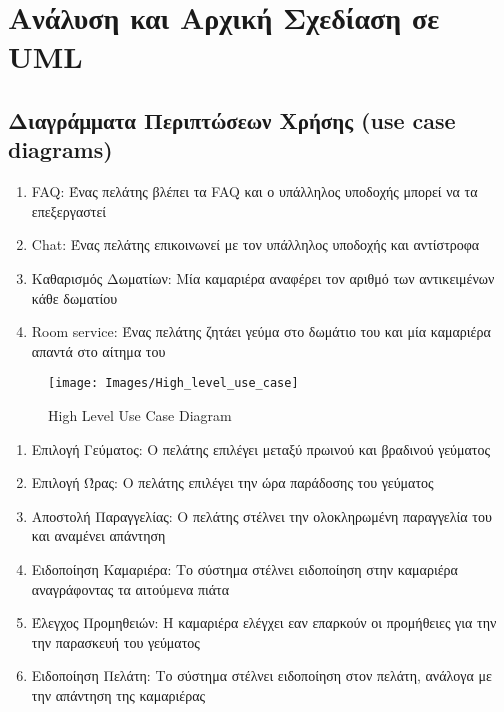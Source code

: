 \chapter{Ανάλυση και Αρχική Σχεδίαση σε UML}
	
\section{Διαγράμματα Περιπτώσεων Χρήσης (use case diagrams)}

\begin{enumerate}
	\item FAQ: Ένας πελάτης βλέπει τα FAQ και ο υπάλληλος υποδοχής μπορεί να τα επεξεργαστεί  
	\item Chat:  Ένας πελάτης επικοινωνεί με τον υπάλληλος υποδοχής και αντίστροφα
	\item Καθαρισμός Δωματίων: Μία καμαριέρα αναφέρει τον αριθμό των αντικειμένων κάθε δωματίου
	\item Room service:  Ένας πελάτης ζητάει γεύμα στο δωμάτιο του και μία καμαριέρα απαντά στο αίτημα του
\end{enumerate}

\begin{figure}[H]
	\centering
	\texttt{[image: Images/High\_level\_use\_case]}
	\caption{High Level Use Case Diagram}
	\label{high_level_use_case}
\end{figure}
\clearpage

\begin{enumerate}
	\item Επιλογή Γεύματος: Ο πελάτης επιλέγει μεταξύ πρωινού και βραδινού γεύματος
	\item Επιλογή Ώρας: Ο πελάτης επιλέγει την ώρα παράδοσης του γεύματος
	\item Αποστολή Παραγγελίας:  Ο πελάτης στέλνει την ολοκληρωμένη παραγγελία του και αναμένει απάντηση
	\item Ειδοποίηση Καμαριέρα: Το σύστημα στέλνει ειδοποίηση στην καμαριέρα αναγράφοντας τα αιτούμενα πιάτα
	\item Έλεγχος Προμηθειών: Η καμαριέρα ελέγχει εαν επαρκούν οι προμήθειες για την την παρασκευή του γεύματος
	\item Ειδοποίηση Πελάτη: Το σύστημα στέλνει ειδοποίηση στον πελάτη, ανάλογα με την απάντηση της καμαριέρας
\end{enumerate}

